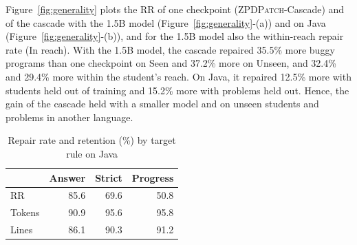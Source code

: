 \documentclass[conference]{IEEEtran}
\begin{document}
Figure~\ref{fig:generality} plots the RR of one checkpoint (\textsc{ZPDPatch}-Cascade) and of the cascade with the 1.5B model (Figure~\ref{fig:generality}-(a)) and on Java (Figure~\ref{fig:generality}-(b)), and for the 1.5B model also the within-reach repair rate (In reach). With the 1.5B model, the cascade repaired 35.5\% more buggy programs than one checkpoint on Seen and 37.2\% more on Unseen, and 32.4\% and 29.4\% more within the student's reach. On Java, it repaired 12.5\% more with students held out of training and 15.2\% more with problems held out. Hence, the gain of the cascade held with a smaller model and on unseen students and problems in another language.

\begin{table}[h]
\caption{Repair rate and retention (\%) by target rule on Java}
\label{tab:javatargets}
\centering\footnotesize
\begin{tabular}{l|rrr}
\toprule
 & Answer & Strict & Progress \\
\midrule
RR & 85.6 & 69.6 & 50.8 \\
Tokens & 90.9 & 95.6 & 95.8 \\
Lines & 86.1 & 90.3 & 91.2 \\
\bottomrule
\end{tabular}
\end{table}
\end{document}
